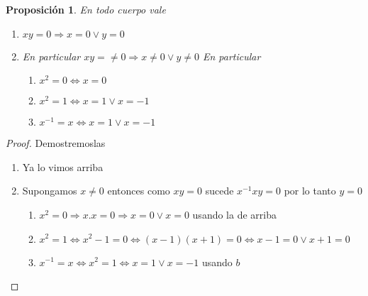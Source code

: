 \documentclass{article}
\theoremstyle{break}
\newtheorem{proposition}{Proposición}
\begin{document}
       \begin{proposition}
            En todo cuerpo vale 
            \begin{enumerate}
                \item $xy=0 \Rightarrow x=0 \lor y=0$
                \item En particular $xy=\neq 0 \Rightarrow x\neq 0 \lor y\neq0$
                En particular 
                \begin{enumerate}
                    \item $x^2 =0 \iff x=0$
                    \item $x^2 =1 \iff x=1 \lor x=-1$
                    \item $x^{-1}=x \iff x=1 \lor x=-1$
                \end{enumerate}
            \end{enumerate}
        \end{proposition}
        \begin{proof}
            Demostremoslas
            \begin{enumerate}
                \item Ya lo vimos arriba
                \item Supongamos $x\neq 0$ entonces como $xy=0$ sucede $x^{-1}xy=0$ por lo tanto $y=0$
                \begin{enumerate}
                    \item $x^2=0 \Rightarrow x.x=0 \Rightarrow x=0 \lor x=0$ usando la de arriba
                    \item $x^2=1 \iff x^2-1=0 \iff (x-1)(x+1) = 0 \iff x-1=0 \lor x+1=0$
                    \item $x^{-1}=x \iff x^2=1 \iff  x=1 \lor x=-1$ usando $b$
                \end{enumerate}

            \end{enumerate}
        \end{proof}
\end{document}
